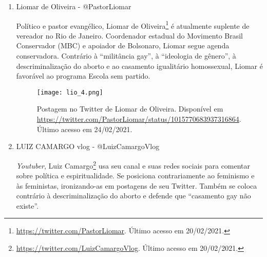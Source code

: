 \documentclass[
	12pt,				%
	openright,			%
	twoside,			%
	a4paper,			%
	english,			%
	brazil				%
	]{abntex2}
\begin{document}
\begin{anexosenv}
\begin{enumerate}
 
 \begin{figure}[!htbp]
    \centering
    \texttt{[image: lets\_2.png]}
    \caption{Postagem no Twitter de Leticia Aguiar. Disponível em \url{https://twitter.com/letsaguiar/status/1344400991073038336}. Último acesso em 24/02/2021.}
 \end{figure}
 
 \begin{figure}[!htbp]
    \centering
    \texttt{[image: lets\_3.png]}
    \caption{Postagem no Twitter de Leticia Aguiar. Disponível em \url{https://twitter.com/letsaguiar/status/1187804120289296385}. Último acesso em 24/02/2021.}
 \end{figure}

 \item Liomar de Oliveira - @PastorLiomar
 
 Político e pastor evangélico, Liomar de Oliveira\footnote{\url{https://twitter.com/PastorLiomar}. Último acesso em 20/02/2021.} é atualmente suplente de vereador no Rio de Janeiro. Coordenador estadual do Movimento Brasil Conservador (MBC) e apoiador de Bolsonaro, Liomar segue agenda conservadora. Contrário à ``militância gay'', à ``ideologia de gênero'', à descriminalização do aborto e ao casamento igualitário homossexual, Liomar é favorável ao programa Escola sem partido.
 
 \begin{figure}[!htbp]
    \centering
    \texttt{[image: lio\_4.png]}
    \caption{Postagem no Twitter de Liomar de Oliveira. Disponível em \url{https://twitter.com/PastorLiomar/status/1015770683937316864}. Último acesso em 24/02/2021.}
 \end{figure}
 
 \newpage

 \item LUIZ CAMARGO vlog - @LuizCamargoVlog
 
 \textit{Youtuber}, Luiz Camargo\footnote{\url{https://twitter.com/LuizCamargoVlog}. Último acesso em 20/02/2021.} usa seu canal e suas redes sociais para comentar sobre política e espiritualidade. Se posiciona contrariamente ao feminismo e às feministas, ironizando-as em postagens de seu Twitter. Também se coloca contrário à descriminalização do aborto e defende que ``casamento gay não existe''.
 

\end{enumerate}
\end{anexosenv}
\end{document}
